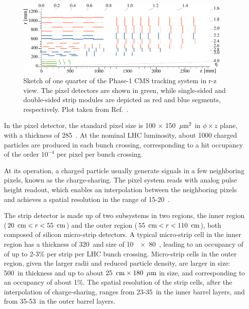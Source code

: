 \begin{figure}[!htb]
    \centering
    \captionsetup{justification=justified}
    \includegraphics[width=0.95\textwidth]{pics/LHC_CMS/Phase1_Tracker.pdf}
    \caption{Sketch of one quarter of the Phase-1 CMS tracking system in r-z view.
             The pixel detectors are shown in green, 
             while single-sided and double-sided strip modules are depicted as red and blue segments, respectively.
             Plot taken from Ref.~\cite{phase1_tracker}.}
    \label{fig:cms_tracker}
\end{figure}

In the pixel detector, the standard pixel size is 100 $\times$ 150 $\,\mu\text{m}^{2}$ in $\phi \times z$ plane, with a thickness of 285~\mum.
At the nominal LHC luminosity, about 1000 charged particles are produced in each bunch crossing, 
corresponding to a hit occupancy of the order $10^{-4}$ per pixel per bunch crossing.

At its operation, a charged particle usually generate signals in a few neighboring pixels, known as the charge-sharing.
The pixel system reads with analog pulse height readout, which enables an interpolation between the neighboring pixels
and achieves a spatial resolution in the range of 15-20~\mum.

The strip detector is made up of two subsystems in two regions, the inner region ($20~\,\text{cm} < r < 55~\,\text{cm}$) 
and the outer region ($55~\,\text{cm} < r < 110~\,\text{cm}$), both composed of silicon micro-strip detectors. 
A typical micro-strip cell in the inner region has a thickness of 320~\mum and size of 10~\cm~$\times$~80~\mum,
leading to an occupancy of of up to 2-3\% per strip per LHC bunch crossing.
Micro-strip cells in the outer region, given the larger radii and reduced particle density, are larger in size:
500~\mum in thickness and up to about $25~\,\text{cm} \times 180~\,\mu\text{m}$ in size,
and corresponding to an occupancy of about 1\%.
The spatial resolution of the strip cells, after the interpolation of charge-sharing, 
ranges from 23-35~\mum in the inner barrel layers, and from 35-53~\mum in the outer barrel layers.  

